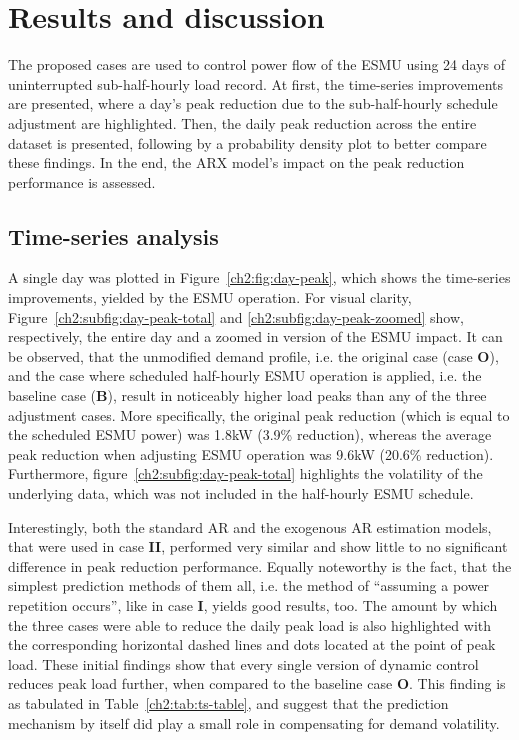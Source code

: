 \section{Results and discussion}
\label{ch2:sec:results}

The proposed cases are used to control power flow of the ESMU using 24 days of uninterrupted sub-half-hourly load record.
At first, the time-series improvements are presented, where a day's peak reduction due to the sub-half-hourly schedule adjustment are highlighted.
Then, the daily peak reduction across the entire dataset is presented, following by a probability density plot to better compare these findings.
In the end, the ARX model's impact on the peak reduction performance is assessed.

\subsection{Time-series analysis}



A single day was plotted in Figure~\ref{ch2:fig:day-peak}, which shows the time-series improvements, yielded by the ESMU operation.
For visual clarity, Figure~\ref{ch2:subfig:day-peak-total} and \ref{ch2:subfig:day-peak-zoomed} show, respectively, the entire day and a zoomed in version of the ESMU impact.
It can be observed, that the unmodified demand profile, i.e. the original case (case \textbf{O}), and the case where scheduled half-hourly ESMU operation is applied, i.e. the  baseline case (\textbf{B}), result in noticeably higher load peaks than any of the three adjustment cases.
More specifically, the original peak reduction (which is equal to the scheduled ESMU power) was 1.8kW (3.9\% reduction), whereas the average peak reduction when adjusting ESMU operation was 9.6kW (20.6\% reduction).
Furthermore, figure~\ref{ch2:subfig:day-peak-total} highlights the volatility of the underlying data, which was not included in the half-hourly ESMU schedule.

Interestingly, both the standard AR and the exogenous AR estimation models, that were used in case \textbf{II}, performed very similar and show little to no significant difference in peak reduction performance.
Equally noteworthy is the fact, that the simplest prediction methods of them all, i.e. the method of ``assuming a power repetition occurs'', like in case \textbf{I}, yields good results, too.
The amount by which the three cases were able to reduce the daily peak load is also highlighted with the corresponding horizontal dashed lines and dots located at the point of peak load.
These initial findings show that every single version of dynamic control reduces peak load further, when compared to the baseline case \textbf{O}.
This finding is as tabulated in Table~\ref{ch2:tab:ts-table}, and suggest that the prediction mechanism by itself did play a small role in compensating for demand volatility.

